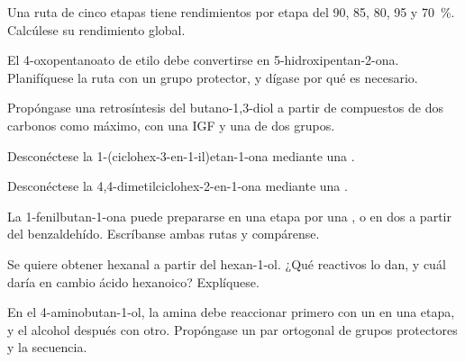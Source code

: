 \begin{exercise}[$\star$]\label{exo:b2:retrosynthesis:3}
Una ruta de cinco etapas tiene rendimientos por etapa del 90, 85, 80, 95 y 70~\%. Calcúlese su rendimiento global.
\end{exercise}

\begin{exercise}[$\star$]\label{exo:b2:retrosynthesis:4}
El 4-oxopentanoato de etilo debe convertirse en 5-hidroxipentan-2-ona. Planifíquese la ruta con un grupo
protector, y dígase por qué es necesario.
\end{exercise}

\begin{exercise}[$\star\star$]\label{exo:b2:retrosynthesis:5}
Propóngase una retrosíntesis del butano-1,3-diol a partir de compuestos de dos carbonos como máximo, con una IGF y una
 de dos grupos.
\end{exercise}

\begin{exercise}[$\star\star$]\label{exo:b2:retrosynthesis:6}
Desconéctese la 1-(ciclohex-3-en-1-il)etan-1-ona mediante una .
\end{exercise}

\begin{exercise}[$\star\star$]\label{exo:b2:retrosynthesis:7}
Desconéctese la 4,4-dimetilciclohex-2-en-1-ona mediante una .
\end{exercise}

\begin{exercise}[$\star\star$]\label{exo:b2:retrosynthesis:8}
La 1-fenilbutan-1-ona puede prepararse en una etapa por una , o en dos a partir del benzaldehído.
Escríbanse ambas rutas y compárense.
\end{exercise}

\begin{exercise}[$\star\star$]\label{exo:b2:retrosynthesis:9}
Se quiere obtener hexanal a partir del hexan-1-ol. ¿Qué reactivos lo dan, y cuál daría en cambio ácido hexanoico?
Explíquese.
\end{exercise}

\begin{exercise}[$\star\star\star$]\label{exo:b2:retrosynthesis:10}
En el 4-aminobutan-1-ol, la amina debe reaccionar primero con un  en una etapa, y el alcohol
después con otro. Propóngase un par ortogonal de grupos protectores y la secuencia.
\end{exercise}


